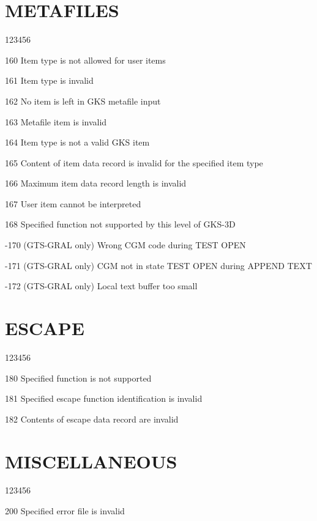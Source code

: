 \section{METAFILES}
\begin{DLtt}{123456}
\item[160]
Item type is not allowed for user items
\item[161]
Item type is invalid
\item[162]
No item is left in GKS metafile input
\item[163]
Metafile item is invalid
\item[164]
Item type is not a valid GKS item
\item[165]
Content of item data record is invalid for the specified item type
\item[166]
Maximum item data record length is invalid
\item[167]
User item cannot be interpreted
\item[168]
Specified function not supported by this level of GKS-3D
\item[-170]
(GTS-GRAL only) Wrong CGM code during TEST OPEN
\item[-171]
(GTS-GRAL only) CGM not in state TEST OPEN during APPEND TEXT
\item[-172]
(GTS-GRAL only) Local text buffer too small
\end{DLtt}
\section{ESCAPE}
\begin{DLtt}{123456}
\item[180]
Specified function is not supported
\item[181]
Specified escape function identification is invalid
\item[182]
Contents of escape data record are invalid
\end{DLtt}
\section{MISCELLANEOUS}
\begin{DLtt}{123456}
\item[200]
Specified error file is invalid
\end{DLtt}
